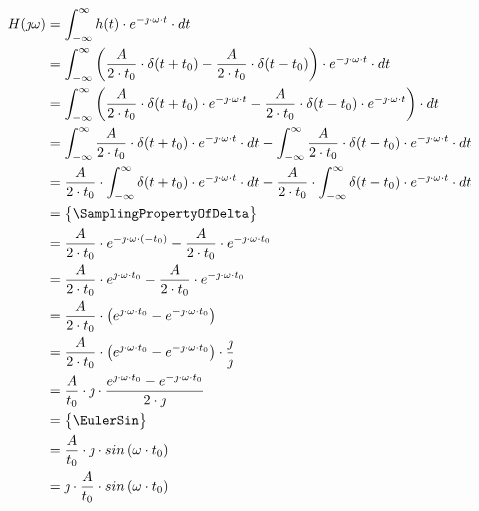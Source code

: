 \begin{task}
\begin{align*}
H(\jmath \omega )&=\int_{-\infty }^{\infty}h(t) \cdot e^{-\jmath \cdot \omega \cdot t}\cdot dt\\
&=\int_{-\infty }^{\infty}\left( \frac{A}{2\cdot t_0} \cdot \delta(t+t_0) - \frac{A}{2\cdot t_0} \cdot \delta(t-t_0) \right) \cdot e^{-\jmath \cdot \omega \cdot t}\cdot dt\\
&=\int_{-\infty }^{\infty}\left( \frac{A}{2\cdot t_0} \cdot \delta(t+t_0)\cdot e^{-\jmath \cdot \omega \cdot t} - \frac{A}{2\cdot t_0} \cdot \delta(t-t_0)\cdot e^{-\jmath \cdot \omega \cdot t} \right) \cdot dt\\
&=\int_{-\infty }^{\infty} \frac{A}{2\cdot t_0} \cdot \delta(t+t_0)\cdot e^{-\jmath \cdot \omega \cdot t}\cdot dt - \int_{-\infty }^{\infty} \frac{A}{2\cdot t_0} \cdot \delta(t-t_0)\cdot e^{-\jmath \cdot \omega \cdot t} \cdot dt\\
&= \frac{A}{2\cdot t_0} \cdot \int_{-\infty }^{\infty} \delta(t+t_0)\cdot e^{-\jmath \cdot \omega \cdot t}\cdot dt - \frac{A}{2\cdot t_0} \cdot \int_{-\infty }^{\infty}  \delta(t-t_0)\cdot e^{-\jmath \cdot \omega \cdot t} \cdot dt\\
&=\begin{Bmatrix}
\SamplingPropertyOfDelta
\end{Bmatrix}\\
&= \frac{A}{2\cdot t_0} \cdot e^{-\jmath \cdot \omega \cdot (-t_0)} - \frac{A}{2\cdot t_0} \cdot e^{-\jmath \cdot \omega \cdot t_0}\\
&= \frac{A}{2\cdot t_0} \cdot e^{\jmath \cdot \omega \cdot t_0} - \frac{A}{2\cdot t_0} \cdot e^{-\jmath \cdot \omega \cdot t_0}\\
&= \frac{A}{2\cdot t_0} \cdot \left(e^{\jmath \cdot \omega \cdot t_0} - e^{-\jmath \cdot \omega \cdot t_0}\right)\\
&= \frac{A}{2\cdot t_0} \cdot \left(e^{\jmath \cdot \omega \cdot t_0} - e^{-\jmath \cdot \omega \cdot t_0}\right) \cdot \frac{\jmath}{\jmath}\\
&= \frac{A}{t_0} \cdot \jmath \cdot \frac{e^{\jmath \cdot \omega \cdot t_0} - e^{-\jmath \cdot \omega \cdot t_0}}{2\cdot \jmath}\\
&=\begin{Bmatrix}
\EulerSin
\end{Bmatrix}\\
&= \frac{A}{t_0} \cdot \jmath \cdot sin\left( \omega \cdot t_0\right)\\
&= \jmath \cdot \frac{A}{t_0} \cdot sin\left( \omega \cdot t_0\right)\\
\end{align*}


\end{task}
